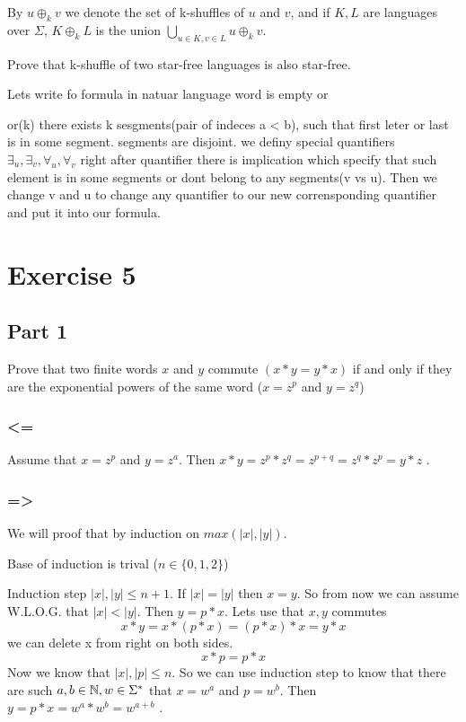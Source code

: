 \documentclass{article}
\begin{document}
By $u \oplus_k v$ we denote the set of k-shuffles of $u$ and $v$, and if $K, L$ are languages over $\Sigma$, $K \oplus_k L$ is the union $\bigcup_{u\in K, v \in L} u \oplus_k v$.

Prove that k-shuffle of two star-free languages is also star-free.

Lets write fo formula in natuar language 
word is empty or 

or(k)
there exists k sesgments(pair of indeces a < b), such that first leter or last is in some segment. 
segments are disjoint.
we definy special quantifiers $\exists_u, \exists_v, \forall_u, \forall_v$ right after quantifier there is implication which specify that such element is in some segments or dont belong to any segments(v vs u).
Then we change v and u to change any quantifier to our new corrensponding quantifier
and put it into our formula.

\section{Exercise 5}

\subsection{Part 1}
Prove that two finite words $x$ and $y$ commute $(x*y = y * x)$ if and only if they are
the exponential powers of the same word ($x = z^p$ and $y=z^q$)

\subsubsection{<=}
Assume that $x = z^p$ and $y = z^a$. Then $x*y = z^p * z^q = z^{p+q} = z^q * z^p = y*z$ \coffee. 

\subsubsection{=>}
We will proof that by induction on $max(|x|, |y|)$.

Base of induction is trival ($n \in \{0,1,2\}$)


Induction step $|x|, |y| \leq n+1$. If $|x| = |y|$ then $x = y$. So from now we can assume W.L.O.G.
that $|x| < |y|$. Then $y = p * x$. Lets use that $x,y$ commutes
\[ x * y = x * (p * x) = (p * x) * x = y * x\]
we can delete x from right on both sides.
\[ x * p = p * x\]
Now we know that $|x|, |p| \leq n$. So we can use induction step to know that there are such $a,b \in \mathbb{N} ,w \in \Sigma^*$ that $x =w^a$ and $p = w^b$. Then $y = p * x = w^a * w^b = w^{a+b}$ \coffee. 
\end{document}
